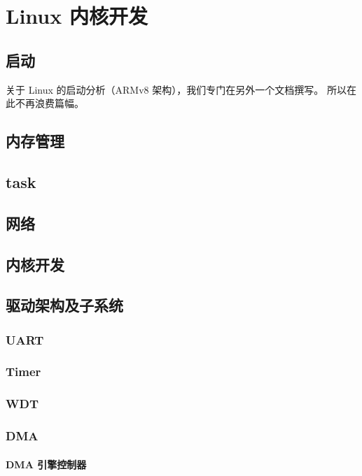 \chapter{Linux 内核开发}

\section{启动}

关于 Linux 的启动分析（ARMv8 架构），我们专门在另外一个文档撰写。
所以在此不再浪费篇幅。

\section{内存管理}

\section{task}

\section{网络}

\section{内核开发}

\section{驱动架构及子系统}
\subsection{UART}

\subsection{Timer}

\subsection{WDT}

\subsection{DMA}

\subsubsection{DMA 引擎控制器}

